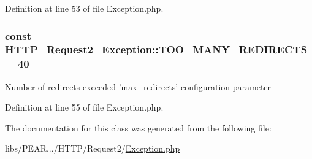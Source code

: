 Definition at line 53 of file Exception.\-php.

\hypertarget{classHTTP__Request2__Exception_accfb520aa06566f09fe26138beb3da62}{
\subsubsection[{T\-O\-O\-\_\-\-M\-A\-N\-Y\-\_\-\-R\-E\-D\-I\-R\-E\-C\-T\-S}]{\setlength{\rightskip}{0pt plus 5cm}const H\-T\-T\-P\-\_\-\-Request2\-\_\-\-Exception\-::\-T\-O\-O\-\_\-\-M\-A\-N\-Y\-\_\-\-R\-E\-D\-I\-R\-E\-C\-T\-S = 40}}\label{classHTTP__Request2__Exception_accfb520aa06566f09fe26138beb3da62}
Number of redirects exceeded 'max\-\_\-redirects' configuration parameter 

Definition at line 55 of file Exception.\-php.



The documentation for this class was generated from the following file\-:\begin{DoxyCompactItemize}
\item 
libs/\-P\-E\-A\-R.../\-H\-T\-T\-P/\-Request2/\hyperlink{HTTP_2Request2_2Exception_8php}{Exception.\-php}\end{DoxyCompactItemize}
